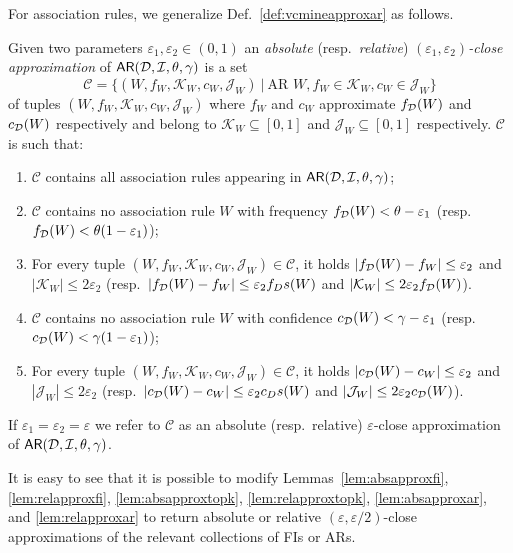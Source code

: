 For association rules, we generalize Def.~\ref{def:vcmineapproxar} as follows.
\begin{definition}\label{def:parmaeapproxar}
  Given two parameters $\varepsilon_1,\varepsilon_2\in(0,1)$ an
  \emph{absolute} (resp.~\emph{relative})
  \emph{$(\varepsilon_1,\varepsilon_2)$-close approximation} of $\mathsf{AR}({\cal D},{\cal I},\theta,\gamma)$
  is a set \[\mathcal{C}=\{(W, f_W, \mathcal{K}_W, c_W, \mathcal{J}_W)~|~ 
  \mbox{AR } W, f_W\in\mathcal{K}_W, c_W\in\mathcal{J}_W\}\]
  of tuples $(W, f_W, \mathcal{K}_W, c_W, \mathcal{J}_W)$ where $f_W$ and $c_W$
  approximate $f_{\cal D}(W)$ and $c_{\cal D}(W)$ respectively and belong to
  $\mathcal{K}_W\subseteq[0,1]$ and
  $\mathcal{J}_W\subseteq[0,1]$ respectively. $\mathcal{C}$ is such
  that:
  \begin{enumerate}
    \item $\mathcal{C}$ contains all association rules appearing in
      $\mathsf{AR}({\cal D},{\cal I},\theta,\gamma)$;
    \item $\mathcal{C}$ contains no association rule $W$ with frequency
      $f_{\cal D}(W)<\theta-\varepsilon_1$ (resp.~$f_{\cal D}(W)<\theta(1-\varepsilon_1)$);
    \item For every tuple $(W, f_W,\mathcal{K}_W,
      c_W,\mathcal{J}_W)\in\mathcal{C}$, it holds
      $|f_{\cal D}(W)-f_W|\le\varepsilon_2$ and $|\mathcal{K}_W|\le 2\varepsilon_2$
      (resp.~$|f_{\cal D}(W)-f_W|\le\varepsilon_2f_Ds(W)$ and $|\mathcal{K}_W|\le
      2\varepsilon_2f_{\cal D}(W)$).
    \item $\mathcal{C}$ contains no association rule $W$ with confidence 
      $c_{\cal D}(W)<\gamma-\varepsilon_1$ (resp.~$c_{\cal D}(W)<\gamma(1-\varepsilon_1)$);
    \item For every tuple $(W, f_W,\mathcal{K}_W,
      c_W,\mathcal{J}_W)\in\mathcal{C}$, it holds
      $|c_{\cal D}(W)-c_W|\le\varepsilon_2$ and $|\mathcal{J}_W|\le 2\varepsilon_2$
      (resp.~$|c_{\cal D}(W)-c_W|\le\varepsilon_2c_Ds(W)$ and $|\mathcal{J}_W|\le
      2\varepsilon_2c_{\cal D}(W)$).
  \end{enumerate}
    If $\varepsilon_1=\varepsilon_2=\varepsilon$ we refer to $\mathcal{C}$ 
  as an absolute (resp.~relative) $\varepsilon$-close approximation of
  $\mathsf{AR}({\cal D},{\cal I},\theta,\gamma)$.
\end{definition}

It is easy to see that it is possible to modify Lemmas~\ref{lem:absapproxfi}, \ref{lem:relapproxfi},
\ref{lem:absapproxtopk}, \ref{lem:relapproxtopk}, \ref{lem:absapproxar}, and
\ref{lem:relapproxar} to return absolute or relative
$(\varepsilon,\varepsilon/2)$-close approximations of the relevant collections
of FIs or ARs.

